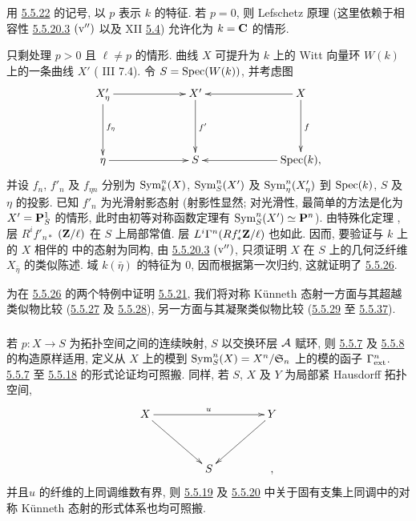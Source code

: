 用 \hyperref[XVII.lem5.5.22]{5.5.22} 的记号, 以 $p$ 表示 $k$ 的特征. 若 $p=0$, 则 Lefschetz 原理 (这里依赖于相容性 \hyperref[XVII.par5.5.20.3]{5.5.20.3} ${\rm(v'')}$ 以及 XII \hyperref[XII.cor5.4]{5.4}) 允许化为 $k=\mathbf{C}$ 的情形.

只剩处理 $p>0$ 且 $\ell\neq p$ 的情形. 曲线 $X$ 可提升为 $k$ 上的 Witt 向量环 $W(k)$ 上的一条曲线 $X'$ ( III 7.4). 令 $S=\operatorname{Spec}(W(k))$, 并考虑图
$$
\xymatrix@C=2.25cm@R=1.5cm{
X'_{\eta} \ar[d]^{f_\eta}          \ar[r]              & X' \ar[d]^{f'}& X\ar[l]\ar[d]^{f}\\
\eta               \ar[r]         & S   & \Spec(k), \ar[l],
}
$$
并\pageoriginale 设 $f_{n}$, $f'_{n}$ 及 $f_{\eta n}$ 分别为 $\operatorname{Sym}^{n}_{k}(X)$, $\operatorname{Sym}^{n}_{S}(X')$ 及 $\operatorname{Sym}^{n}_{\eta}(X'_{\eta})$ 到 $\operatorname{Spec}(k)$, $S$ 及 $\eta$ 的投影. 已知 $f'_{n}$ 为光滑射影态射 (射影性显然; 对光滑性, 最简单的方法是化为 $X'=\mathbf{P}^{1}_{S}$ 的情形, 此时由初等对称函数定理有 $\operatorname{Sym}^{n}_{S}(X')\simeq
\mathbf{P}^{n}$). 由特殊化定理 , 层 $R^{i}f'_{n{\ast}}$ $(\mathbf{Z}/\ell)$ 在 $S$ 上局部常值. 层 $L^{i}\Gamma^{n}(Rf'_{\ast}\mathbf{Z}/\ell)$ 也如此. 因而, 要验证与 $k$ 上的 $X$ 相伴的  中的态射为同构, 由 \hyperref[XVII.par5.5.20.3]{5.5.20.3} ${\rm(v'')}$, 只须证明 $X$ 在 $S$ 上的几何泛纤维 $X_{\bar{\eta}}$ 的类似陈述. 域 $k(\bar{\eta})$ 的特征为 $0$, 因而根据第一次归约, 这就证明了 \hyperref[XVII.lem5.5.26]{5.5.26}.

为在 \hyperref[XVII.lem5.5.26]{5.5.26} 的两个特例中证明 \hyperref[XVII.thm5.5.21]{5.5.21}, 我们将对称 Künneth 态射一方面与其超越类似物比较 (\hyperref[XVII.subsubsec5.5.27]{5.5.27} 及 \hyperref[XVII.subsubsec5.5.28]{5.5.28}), 另一方面与其凝聚类似物比较 (\hyperref[XVII.subsubsec5.5.29]{5.5.29} 至 \hyperref[XVII.lem5.5.37]{5.5.37}).

\setcounter{subsubsection}{26}
\subsubsection{}
若 $p:X\rightarrow S$ 为拓扑空间之间的连续映射, $S$ 以交换环层 ${\mathcal A}$ 赋环, 则 \hyperref[XVII.subsubsec5.5.7]{5.5.7} 及 \hyperref[XVII.subsubsec5.5.8]{5.5.8} 的构造原样适用, 定义从 $X$ 上的模到 $\operatorname{Sym}^{n}_{S}(X)=X^{n}/\mathfrak{S}_{n}$ 上的模的函子 $\Gamma^{n}_{\operatorname{ext}}$. \hyperref[XVII.subsubsec5.5.7]{5.5.7} 至 \hyperref[XVII.prop5.5.18]{5.5.18} 的形式论证均可照搬. 同样, 若 $S$, $X$ 及 $Y$ 为局部紧 Hausdorff 拓扑空间,
$$
\xymatrix@C=1.5cm@R=1.25cm{
X \ar[rr]^{u}\ar[rd]&  &  Y\ar[ld]\\
            & S &,
}
$$
并且\pageoriginale $u$ 的纤维的上同调维数有界, 则 \hyperref[XVII.subsubsec5.5.19]{5.5.19} 及 \hyperref[XVII.subsubsec5.5.20]{5.5.20} 中关于固有支集上同调中的对称 Künneth 态射的形式体系也均可照搬.

